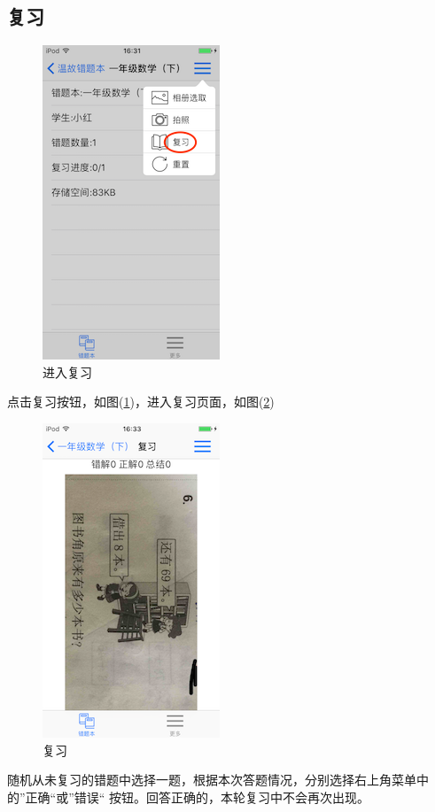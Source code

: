 \subsection{复习}
\begin{figure}[H]
	\centering
	\includegraphics{img/24.png}
	\caption{进入复习}
	\label{img24}
\end{figure}

点击复习按钮，如图(\ref{img24})，进入复习页面，如图(\ref{img25})

\begin{figure}[H]
	\centering
	\includegraphics{img/25.png}
	\caption{复习}
	\label{img25}
\end{figure}

随机从未复习的错题中选择一题，根据本次答题情况，分别选择右上角菜单中的”正确“或”错误“ 按钮。回答正确的，本轮复习中不会再次出现。

